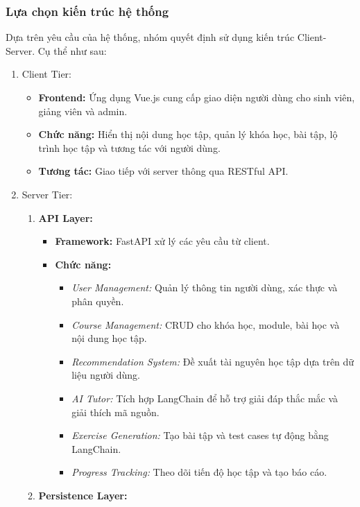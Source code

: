 \subsubsection{Lựa chọn kiến trúc hệ thống}
Dựa trên yêu cầu của hệ thống, nhóm quyết định sử dụng kiến trúc Client-Server. Cụ thể như sau:
\begin{enumerate}
    \item Client Tier:
    \begin{itemize}
        \item \textbf{Frontend:} Ứng dụng Vue.js cung cấp giao diện người dùng cho sinh viên, giảng viên và admin.
        \item \textbf{Chức năng:} Hiển thị nội dung học tập, quản lý khóa học, bài tập, lộ trình học tập và tương tác với người dùng.
        \item \textbf{Tương tác:} Giao tiếp với server thông qua RESTful API.
    \end{itemize}
    \item Server Tier:
    \begin{enumerate}
        \item \textbf{API Layer:}
        \begin{itemize}
            \item \textbf{Framework:} FastAPI xử lý các yêu cầu từ client.
            \item \textbf{Chức năng:}
            \begin{itemize}
                \item \textit{User Management:} Quản lý thông tin người dùng, xác thực và phân quyền.
                \item \textit{Course Management:} CRUD cho khóa học, module, bài học và nội dung học tập.
                \item \textit{Recommendation System:} Đề xuất tài nguyên học tập dựa trên dữ liệu người dùng.
                \item \textit{AI Tutor:} Tích hợp LangChain để hỗ trợ giải đáp thắc mắc và giải thích mã nguồn.
                \item \textit{Exercise Generation:} Tạo bài tập và test cases tự động bằng LangChain.
                \item \textit{Progress Tracking:} Theo dõi tiến độ học tập và tạo báo cáo.
            \end{itemize}
        \end{itemize}
        \item \textbf{Persistence Layer:}
        \begin{itemize}

\end{itemize}
\end{enumerate}
\end{enumerate}

